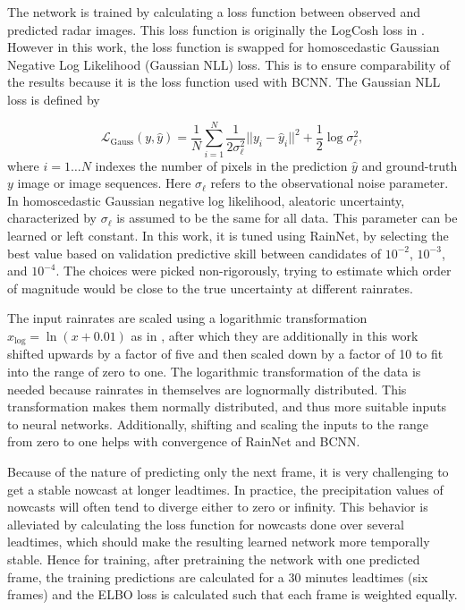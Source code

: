 The network is trained by calculating a loss function between observed and predicted radar images. This loss function is originally the LogCosh loss in \citet{ayzel_rainnet_nodate}. However in this work, the loss function is swapped for homoscedastic Gaussian Negative Log Likelihood (Gaussian NLL) loss. This is to ensure comparability of the results because it is the loss function used with BCNN. The Gaussian NLL loss \cite{kendall_what_2017} is defined by 

\begin{equation}
\mathcal{L}_\text{Gauss}(y, \hat{y}) = \frac{1}{N} \sum_{i=1}^{N} \frac{1}{2\sigma_\ell^2}||y_i - \hat{y}_i||^2 
+ \frac{1}{2} \log \sigma_\ell^2,
\end{equation}
%
where $i = 1 \dots N$ indexes the number of pixels in the prediction $\hat{y}$ and ground-truth $y$ image or image sequences. Here $\sigma_\ell$ refers to the observational noise parameter. In homoscedastic Gaussian negative log likelihood, aleatoric uncertainty, characterized by $\sigma_\ell$ is assumed to be the same for all data. This parameter can be learned or left constant. In this work, it is tuned using RainNet, by selecting the best value based on validation predictive skill between candidates of $10^{-2}$, $10^{-3}$, and $10^{-4}$. The choices were picked non-rigorously, trying to estimate which order of magnitude would be close to the true uncertainty at different rainrates.

The input rainrates are scaled using a logarithmic transformation $x_{\log} = \ln(x + 0.01)$ as in \citet{ayzel_rainnet_nodate}, after which they are additionally in this work shifted upwards by a factor of five and then scaled down by a factor of 10 to fit into the range of zero to one. The logarithmic transformation of the data is needed because rainrates in themselves are lognormally distributed. This transformation makes them normally distributed, and thus more suitable inputs to neural networks. Additionally, shifting and scaling the inputs to the range from zero to one helps with convergence of RainNet and BCNN. 

Because of the nature of predicting only the next frame, it is very challenging to get a stable nowcast at longer leadtimes. In practice, the precipitation values of nowcasts will often tend to diverge either to zero or infinity. This behavior is alleviated by calculating the loss function for nowcasts done over several leadtimes, which should make the resulting learned network more temporally stable. Hence for training, after pretraining the network with one predicted frame, the training predictions are calculated for a 30 minutes leadtimes (six frames) and the ELBO loss is calculated such that each frame is weighted equally. 

